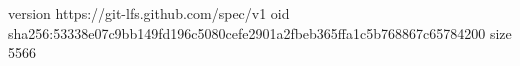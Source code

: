 version https://git-lfs.github.com/spec/v1
oid sha256:53338e07c9bb149fd196c5080cefe2901a2fbeb365ffa1c5b768867c65784200
size 5566
